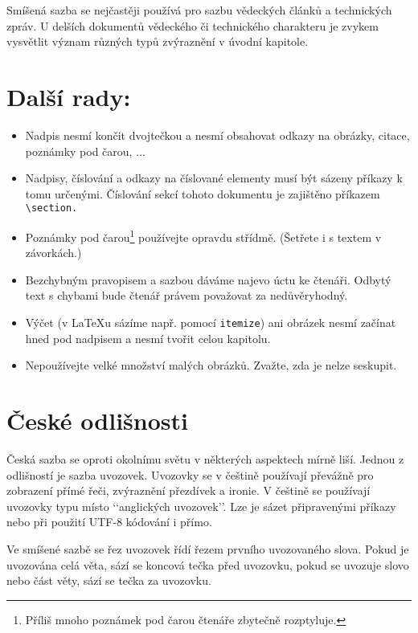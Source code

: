 \documentclass[10pt, a4paper, twocolumn]{article}
\begin{document}
Smíšená sazba se nejčastěji používá pro sazbu vědeckých článků a technických zpráv.
U delších dokumentů vědeckého či technického charakteru je zvykem vysvětlit význam různých typů zvýraznění v úvodní kapitole.

\hypertarget{third}{\section{Další rady:}}

\begin{itemize}
    \item Nadpis nesmí končit dvojtečkou a nesmí obsahovat odkazy na obrázky, citace, poznámky pod čarou, ...
    \item Nadpisy, číslování a odkazy na číslované elementy musí být sázeny příkazy k tomu určenými.
Číslování sekcí tohoto dokumentu je zajištěno příkazem \texttt{\textbackslash section.}
    \item Poznámky pod čarou\footnote{Příliš mnoho poznámek pod čarou čtenáře zbytečně rozptyluje.} používejte opravdu střídmě.
(Šetřete i s textem v závorkách.)
    \item Bezchybným pravopisem a sazbou dáváme najevo úctu ke čtenáři.
Odbytý text s chybami bude čtenář právem považovat za nedůvěryhodný.
    \item Výčet (v \LaTeX u sázíme např. pomocí \texttt{itemize}) ani obrázek nesmí začínat hned pod nadpisem a nesmí tvořit celou kapitolu.
    \item Nepoužívejte velké množství malých obrázků.
Zvažte, zda je nelze seskupit.
\end{itemize}

\hypertarget{fourth}{\section{České odlišnosti}}

Česká sazba se oproti okolnímu světu v některých aspektech mírně liší.
Jednou z odlišností je sazba uvozovek.
Uvozovky se v češtině používají převážně pro zobrazení přímé řeči, zvýraznění přezdívek a ironie.
V češtině se používají uvozovky typu  místo ‘‘anglických uvozovek’’.
Lze je sázet připravenými příkazy nebo při použití UTF-8 kódování i přímo.

Ve smíšené sazbě se řez uvozovek řídí řezem prvního uvozovaného slova.
Pokud je uvozována celá věta, sází se koncová tečka před uvozovku, pokud se uvozuje slovo nebo část věty, sází se tečka za uvozovku.
\end{document}
